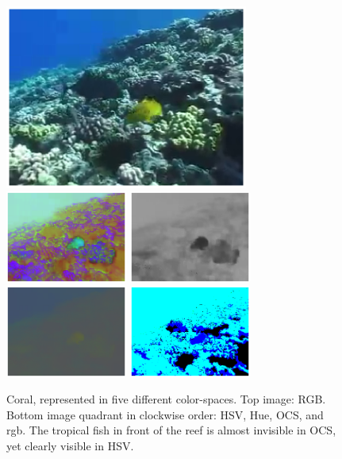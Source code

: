 \documentclass[a4paper,11pt]{article}
\begin{document}
		\begin{figure}[H]
			\begin{center}
				\includegraphics[width=8cm]{img/cs_RGB.eps}\\
				\includegraphics[width=4cm]{img/cs_HSV.eps}
				\includegraphics[width=4cm]{img/cs_Hue.eps}\\
				\includegraphics[width=4cm]{img/cs_nRGB.eps}
				\includegraphics[width=4cm]{img/cs_OCS.eps}
			\end{center}
			\caption{
				Coral, represented in five different color-spaces. Top image:
				RGB. Bottom image quadrant in clockwise order: HSV, Hue, OCS,
				and rgb. The tropical fish in front of the reef is almost
				invisible in OCS, yet clearly visible in HSV.
			}
			\label{fig:CORAL}
		\end{figure}
\end{document}
